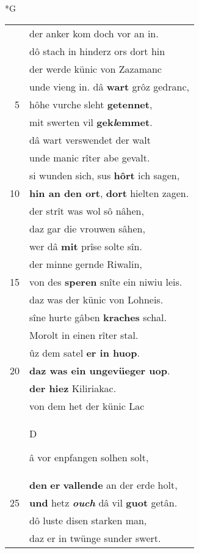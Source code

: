 \documentclass[8pt,a4paper,notitlepage]{article}
\begin{document}
\newpage
\begin{table}[ht]
\begin{minipage}[t]{0.5\linewidth}
\small
\begin{center}*G
\end{center}
\begin{tabular}{rl}
 & der anker kom doch vor an in.\\ 
 & dô stach in hinderz ors dort hin\\ 
 & der werde künic von Zazamanc\\ 
 & unde vieng in. dâ \textbf{wart} grôz gedranc,\\ 
5 & hôhe vurche sleht \textbf{getennet},\\ 
 & mit swerten vil \textbf{gek\textit{l}emmet}.\\ 
 & dâ wart verswendet der walt\\ 
 & unde manic rîter abe gevalt.\\ 
 & si wunden sich, sus \textbf{hôrt} ich sagen,\\ 
10 & \textbf{hin an den ort}, \textbf{dort} hielten zagen.\\ 
 & der strît was wol sô nâhen,\\ 
 & daz gar die vrouwen sâhen,\\ 
 & wer dâ \textbf{mit} prîse solte sîn.\\ 
 & der minne gernde Riwalin,\\ 
15 & von des \textbf{speren} snîte ein niwiu leis.\\ 
 & daz was der künic von Lohneis.\\ 
 & sîne hurte gâben \textbf{kraches} schal.\\ 
 & Morolt in einen rîter stal.\\ 
 & ûz dem satel \textbf{er in huop}.\\ 
20 & \textbf{daz was ein ungevüeger uop}.\\ 
 & \textbf{der hiez} Kiliriakac.\\ 
 & von dem het der künic Lac\\ 
 & \begin{large}D\end{large}â vor enpfangen solhen solt,\\ 
 & \textbf{den} \textbf{er} \textbf{vallende} an der erde holt,\\ 
25 & \textbf{und} hetz \textit{\textbf{ouch}} dâ vil \textbf{guot} getân.\\ 
 & dô luste disen starken man,\\ 
 & daz er in twünge sunder swert.\\ 

\end{tabular}
\end{minipage}
\end{table}
\end{document}
